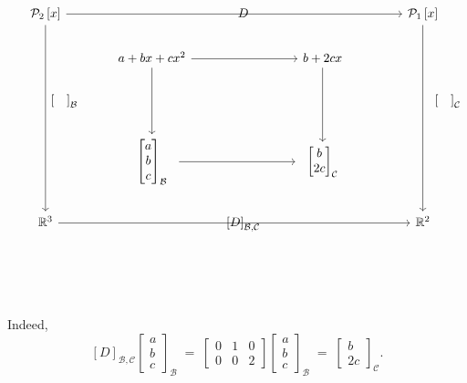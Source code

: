 \documentclass{report}
\begin{document}
    \[\begin{tikzcd}
     \mathcal{P}_2\left[ x \right]  && D && \mathcal{P}_1\left[ x \right]  \\
	& {a+bx+cx^2} && {b+2cx} \\
	{ \quad \qquad \left[ \quad \right]_{\mathcal{B}}} &&&& { \qquad \qquad \left[ \quad \right]_{\mathcal{C}}} \\
	& \begin{array}{c} \begin{bmatrix} a\\ b\\ c\end{bmatrix}_{\mathcal{B}} \end{array} && \begin{array}{c} \begin{bmatrix} b\\ 2c\end{bmatrix}_{\mathcal{C}} \end{array} \\
	{\mathbb{R}^3} && {\left[D \right]_{\mathcal{B}, \mathcal{C}}} && {\mathbb{R}^2}
	\arrow[from=1-1, to=1-5]
	\arrow[from=1-1, to=5-1]
	\arrow[from=1-5, to=5-5]
	\arrow[from=2-2, to=2-4]
	\arrow[from=2-2, to=4-2]
	\arrow[from=2-4, to=4-4]
	\arrow[from=4-2, to=4-4]
	\arrow[from=5-1, to=5-5]
\end{tikzcd}\] \\
\\





 \\
 \\

Indeed,
\[
[D]_{\mathcal{B},\mathcal{C}}
  \begin{bmatrix}a\\ b\\ c\end{bmatrix}_{\mathcal{B}}
  \;=\;
  \begin{bmatrix}
    0 & 1 & 0\\
    0 & 0 & 2
  \end{bmatrix}
  \begin{bmatrix}a\\ b\\ c\end{bmatrix}_{\mathcal{B}}
  \;=\;
  \begin{bmatrix}b\\ 2c\end{bmatrix}_{\mathcal{C}}.
\]
\end{document}
